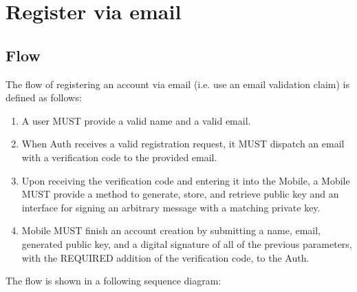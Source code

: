 \section{Register via email}

    \subsection{Flow}
    The flow of registering an account via email (i.e. use an email validation claim) is defined as follows:
        \begin{enumerate}
            \item A user MUST provide a valid name and a valid email.
            \item When Auth receives a valid registration request, it MUST dispatch an email with a verification 
                  code to the provided email.
            \item Upon receiving the verification code and entering it into the Mobile, a Mobile MUST provide a 
                  method to generate, store, and retrieve public key and an interface for signing an arbitrary 
                  message with a matching private key.
            \item Mobile MUST finish an account creation by submitting a name, email, generated public key, and 
                  a digital signature of all of the previous parameters, with the REQUIRED addition of the 
                  verification code, to the Auth.
        \end{enumerate}

    The flow is shown in a following sequence diagram:    
        

